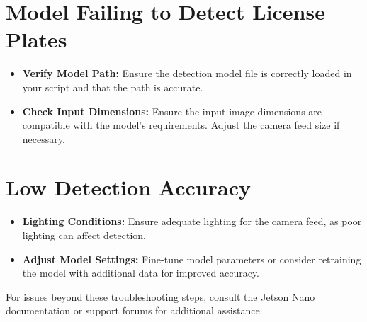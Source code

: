 \section{Model Failing to Detect License Plates}
\begin{itemize}[label=--, left=1.5em]
	\item \textbf{Verify Model Path:} Ensure the detection model file is correctly loaded in your script and that the path is accurate.
	\item \textbf{Check Input Dimensions:} Ensure the input image dimensions are compatible with the model’s requirements. Adjust the camera feed size if necessary.
\end{itemize}

\section{Low Detection Accuracy}
\begin{itemize}[label=--, left=1.5em]
	\item \textbf{Lighting Conditions:} Ensure adequate lighting for the camera feed, as poor lighting can affect detection.
	\item \textbf{Adjust Model Settings:} Fine-tune model parameters or consider retraining the model with additional data for improved accuracy.
\end{itemize}

For issues beyond these troubleshooting steps, consult the Jetson Nano documentation or support forums for additional assistance.




